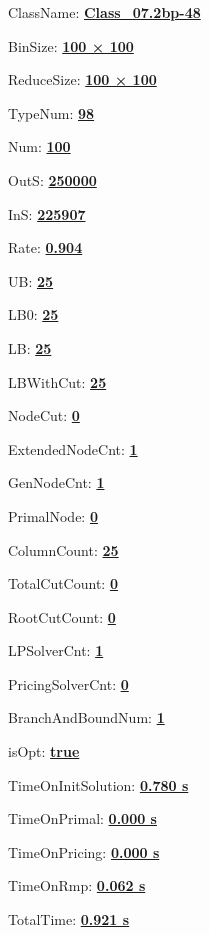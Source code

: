\documentclass[11pt]{article}
\begin{document}
\pagestyle{empty}


ClassName: \underline{\textbf{Class_07.2bp-48}}
\par
BinSize: \underline{\textbf{100 × 100}}
\par
ReduceSize: \underline{\textbf{100 × 100}}
\par
TypeNum: \underline{\textbf{98}}
\par
Num: \underline{\textbf{100}}
\par
OutS: \underline{\textbf{250000}}
\par
InS: \underline{\textbf{225907}}
\par
Rate: \underline{\textbf{0.904}}
\par
UB: \underline{\textbf{25}}
\par
LB0: \underline{\textbf{25}}
\par
LB: \underline{\textbf{25}}
\par
LBWithCut: \underline{\textbf{25}}
\par
NodeCut: \underline{\textbf{0}}
\par
ExtendedNodeCnt: \underline{\textbf{1}}
\par
GenNodeCnt: \underline{\textbf{1}}
\par
PrimalNode: \underline{\textbf{0}}
\par
ColumnCount: \underline{\textbf{25}}
\par
TotalCutCount: \underline{\textbf{0}}
\par
RootCutCount: \underline{\textbf{0}}
\par
LPSolverCnt: \underline{\textbf{1}}
\par
PricingSolverCnt: \underline{\textbf{0}}
\par
BranchAndBoundNum: \underline{\textbf{1}}
\par
isOpt: \underline{\textbf{true}}
\par
TimeOnInitSolution: \underline{\textbf{0.780 s}}
\par
TimeOnPrimal: \underline{\textbf{0.000 s}}
\par
TimeOnPricing: \underline{\textbf{0.000 s}}
\par
TimeOnRmp: \underline{\textbf{0.062 s}}
\par
TotalTime: \underline{\textbf{0.921 s}}
\par
\newpage


\end{document}
